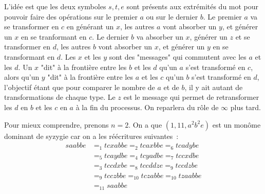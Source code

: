\documentclass{article}
\begin{document}
L'idée est que les deux symboles $s, t, e$ sont présents aux extrémités du mot pour pouvoir faire des opérations sur le premier $a$ ou sur le dernier $b$.
Le premier $a$ va se transformer en $c$ en générant un $x$, les autres $a$ vont absorber un $y$, et générer un $x$ en se tranformant en $c$.
Le dernier $b$ va absorber un $x$, générer un $z$ et se transformer en $d$, les autres $b$ vont absorber un $x$, et générer un $y$ en se transformant en $d$.
Les $x$ et les $y$ sont des "messages" qui commutent avec les $a$ et les $d$. Un $x$ "dit" à la frontière entre les $b$ et les $d$ qu'un $a$ s'est transformé en $c$, alors qu'un $y$ "dit" à la frontière entre les $a$ et les $c$ qu'un $b$ s'est transformé en $d$, l'objectif étant que pour comparer le nombre de $a$ et de $b$, il y ait autant de transformations de chaque type.
Le $z$ est le message qui permet de retransformer les $d$ en $b$ et les $c$ en $a$ à la fin du processus. On reparlera du rôle de $\infty$ plus tard.

Pour mieux comprendre, prenons $n = 2$. On a que $(1, 11, a^2b^2e)$ est un monôme dominant de syzygie car on a les réécritures suivantes~:
\begin{align*}
saabbe & =_{1} tcxabbe =_{2} tcaxbbe =_{6} tcadybe \\
& =_{5} tcaydbe =_{4} tcyadbe =_{7} tccxdbe \\
& =_{3} tccdxbe =_{8} tccddze =_{9} tccdzbe \\
& =_{9} tcczbbe =_{10} tczabbe =_{10} tzaabbe \\
& =_{11} saabbe
\end{align*}
\end{document}
